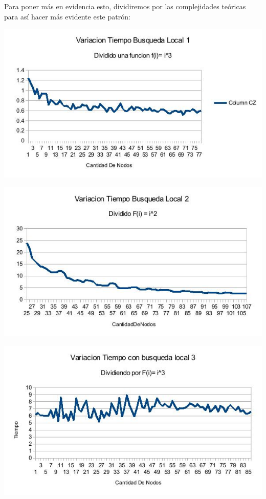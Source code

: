 Para poner más en evidencia esto, dividiremos por las complejidades teóricas para así hacer más evidente este patrón:

\includegraphics[scale=0.5]{Ej4/tiempo1div.jpg}

\includegraphics[scale=0.5]{Ej4/tiempo2div.jpg}

\includegraphics[scale=0.5]{Ej4/tiempo3div.jpg}

